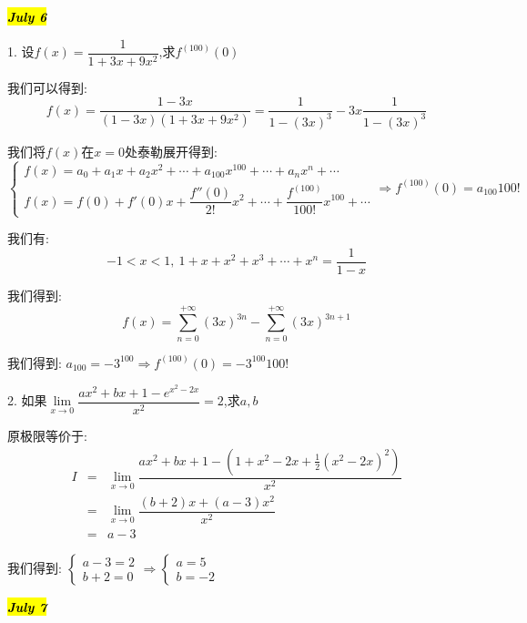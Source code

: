 \hl{\textbf{\textit{July 6}}}

1. 设$f(x)=\dfrac{1}{1+3x+9x^2}$,求$f^{(100)}(0)$
\begin{solution}
	
	我们可以得到: 
	$$f(x)=\dfrac{1-3x}{(1-3x)(1+3x+9x^2)}=\dfrac{1}{1-(3x)^3}-3x\dfrac{1}{1-(3x)^3}$$
	
	我们将$f(x)$在$x=0$处泰勒展开得到: 
	$$\left\lbrace
	\begin{array}{l}
		f(x)=a_{0}+a_{1}x+a_{2}x^2+\cdots+a_{100}x^{100}+\cdots+a_{n}x^{n}+\cdots\\
		f(x)=f(0)+f'(0)x+\dfrac{f''(0)}{2!}x^2+\cdots+\dfrac{f^{(100)}}{100!}x^{100}+\cdots
	\end{array}
	\right. \Rightarrow f^{(100)}(0)=a_{100}100!$$
	
	我们有: $$-1<x<1,\ 1+x+x^2+x^3+\cdots+x^n=\dfrac{1}{1-x}$$
	
	我们得到: 
	$$f(x)=\sum\limits_{n=0}^{+\infty}(3x)^{3n}-\sum\limits_{n=0}^{+\infty}(3x)^{3n+1}$$
	
	我们得到: $a_{100}=-3^{100}\Rightarrow f^{(100)}(0)=-3^{100}100!$
\end{solution}

2. 如果$\lim\limits_{x\rightarrow 0}\dfrac{ax^2+bx+1-e^{x^2-2x}}{x^2}=2$,求$a,b$
\begin{solution}
	
	原极限等价于: 
	\begin{eqnarray*}
		I&=&\lim\limits_{x\rightarrow 0}\dfrac{ax^2+bx+1-(1+x^2-2x+\frac{1}{2}(x^2-2x)^2)}{x^2}\\
		&=&\lim\limits_{x\rightarrow 0}\dfrac{(b+2)x+(a-3)x^2}{x^2}\\
		&=&a-3
	\end{eqnarray*}
	
	我们得到: $\left\lbrace
	\begin{array}{l}
		a-3=2\\
		b+2=0
	\end{array}
	\right. \Rightarrow \left\lbrace
	\begin{array}{l}
		a=5\\
		b=-2
	\end{array}
	\right. $
\end{solution}

\hl{\textbf{\textit{July 7}}}

